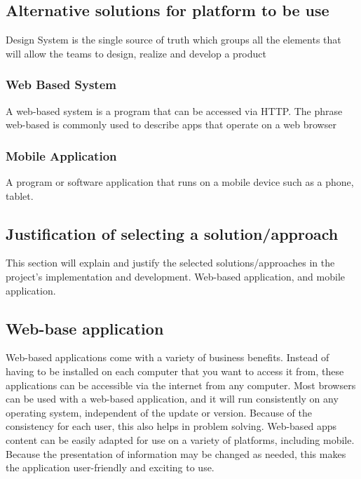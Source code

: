 \documentclass[11pt]{article}
\newcommand\tab[1][1cm]{\hspace*{#1}}
\begin{document}
\subsection{Alternative solutions for platform to be use}
\tab Design System is the single source of truth which groups all the elements that will allow the teams to design, realize and develop a product

\subsubsection{Web Based System}
\tab      A web-based system is a program that can be accessed via HTTP. The phrase web-based is commonly used to describe apps that operate on a web browser

\subsubsection{Mobile Application}
 \tab      A program or software application that runs on a mobile device such as a phone, tablet.

\newpage

\begin{center}
\section{Justification of selecting a solution/approach}
\end{center}


 \tab This section will explain and justify the selected  solutions/approaches in the project's implementation and development. Web-based application, and mobile application.


\subsection{Web-base application}

\tab Web-based applications come with a variety of business benefits. Instead of having to be installed on each computer that you want to access it from, these applications can be accessible via the internet from any computer. Most browsers can be used with a web-based application, and it will run consistently on any operating system, independent of the update or version. Because of the consistency for each user, this also helps in problem solving. Web-based apps content can be easily adapted for use on a variety of platforms, including mobile. Because the presentation of information may be changed as needed, this makes the application user-friendly and exciting to use.
\end{document}
